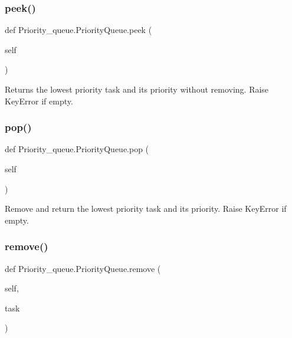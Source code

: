 \subsubsection{\texorpdfstring{peek()}{peek()}}
{\footnotesize\ttfamily def Priority\+\_\+queue.\+Priority\+Queue.\+peek (\begin{DoxyParamCaption}\item[{}]{self }\end{DoxyParamCaption})}

\begin{DoxyVerb}Returns the lowest priority task and its priority without removing. Raise KeyError if empty.\end{DoxyVerb}
 \mbox{\label{class_priority__queue_1_1_priority_queue_a27e13435b664d05b800751e19d46f21b}} 
\subsubsection{\texorpdfstring{pop()}{pop()}}
{\footnotesize\ttfamily def Priority\+\_\+queue.\+Priority\+Queue.\+pop (\begin{DoxyParamCaption}\item[{}]{self }\end{DoxyParamCaption})}

\begin{DoxyVerb}Remove and return the lowest priority task and its priority. Raise KeyError if empty.\end{DoxyVerb}
 \mbox{\label{class_priority__queue_1_1_priority_queue_a311e92d0a6c8a26393d9122b159d6b17}} 
\subsubsection{\texorpdfstring{remove()}{remove()}}
{\footnotesize\ttfamily def Priority\+\_\+queue.\+Priority\+Queue.\+remove (\begin{DoxyParamCaption}\item[{}]{self,  }\item[{}]{task }\end{DoxyParamCaption})}

